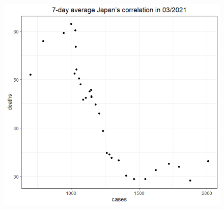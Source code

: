 \documentclass[english,10pt,table]{beamer}
\begin{document}
{\begin{figure}[H]
\begin{center}
        \includegraphics[scale = 0.2]{ix/ix.3/JPN_03_2021.png}
    \end{center}
    \end{figure}
}
\end{document}
